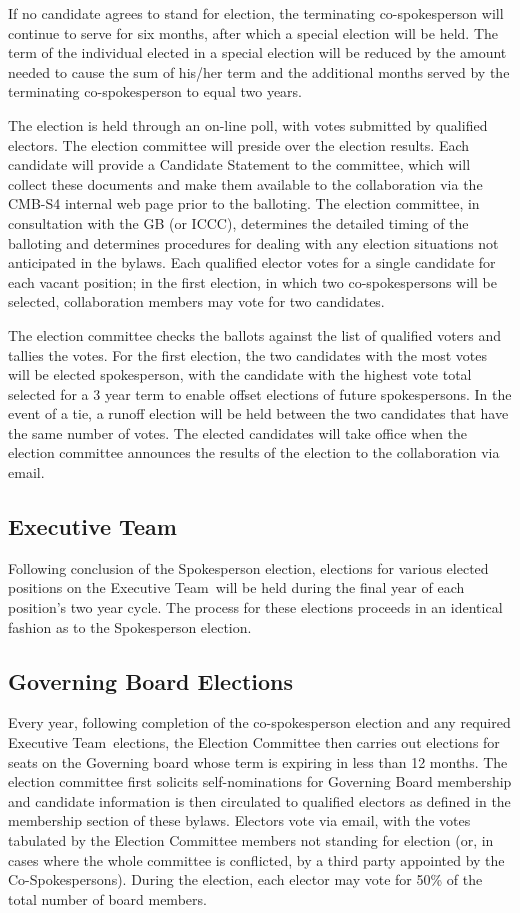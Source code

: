 \documentclass[12pt]{article}
\newcommand{\exec}{{Executive Team}}
\begin{document}
If no candidate agrees to stand for election, the terminating co-spokesperson will continue to serve for six months, after which a special election will be held. The term of the individual elected in a special election will be reduced by the amount needed to cause the sum of his/her term and the additional months served by the terminating co-spokesperson to equal two years.

The election is held through an on-line poll, with votes submitted by qualified electors. The election committee will preside over the election results. Each candidate will provide a Candidate Statement to the committee, which will collect these documents and make them available to the collaboration via the CMB-S4 internal web page prior to the balloting. The election committee, in consultation with the GB (or ICCC), determines the detailed timing of the balloting and determines procedures for dealing with any election situations not anticipated in the bylaws. Each qualified elector votes for a single candidate for each vacant position; in the first election, in which two co-spokespersons will be selected, collaboration members may vote for two candidates. 

The election committee checks the ballots against the list of qualified voters and tallies the votes. For the first election, the two candidates with the most votes will be elected spokesperson, with the candidate with the highest vote total selected for a 3 year term to enable offset elections of future spokespersons.  In the event of a tie, a runoff election will be held between the two candidates that have the same number of votes. The elected candidates will take office when the election committee announces the results of the election to the collaboration via email. 

\subsection{\exec}
Following conclusion of the Spokesperson election, elections for various elected positions on the \exec \ will be held during the final year of each position's two year cycle. The process for these elections proceeds in an identical fashion as to the Spokesperson election. 

\subsection{Governing Board Elections }

Every year, following completion of the co-spokesperson election and any required \exec \ elections, the Election Committee then carries out elections for seats on the Governing board whose term is expiring in less than 12 months. The election committee first solicits self-nominations for Governing Board membership and candidate information is then circulated to qualified electors as defined in the membership section of these bylaws. Electors vote via email, with the votes tabulated by the Election Committee members not standing for election (or, in cases where the whole committee is conflicted, by a third party appointed by the Co-Spokespersons). During the election, each elector may vote for 50\% of the total number of board members. 
\end{document}

